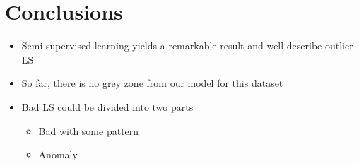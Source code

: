 \chapter{Conclusions}

\begin{itemize}
    \item Semi-supervised learning yields a remarkable result and well describe outlier LS
    \item So far, there is no grey zone from our model for this dataset
    \item Bad LS could be divided into two parts
    \begin{itemize}
        \item Bad with some pattern
        \item Anomaly
    \end{itemize}
\end{itemize}